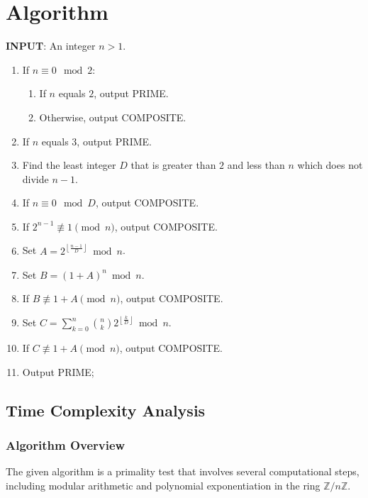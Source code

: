 \documentclass{article}
\theoremstyle{plain}
\theoremstyle{definition}
\begin{document}
\section{Algorithm} \label{section:algorithm}
\textbf{INPUT}: An integer $n > 1$.
\begin{center}
    \begin{enumerate}
        \item If $n \equiv 0 \mod{2}$:
            \begin{enumerate}
                \item If $n$ equals $2$, output PRIME.
                \item Otherwise, output COMPOSITE.
            \end{enumerate}
        \item If $n$ equals $3$, output PRIME.
        \item Find the least integer $D$ that is greater than $2$ and less than $n$ which does not divide $n-1$.
        \item If $n \equiv 0 \mod{D}$, output COMPOSITE.
        \item If $2^{n-1} \not\equiv 1 \pmod{n}$, output COMPOSITE.
        \item Set $A = 2^{\left\lfloor \frac{n-1}{D} \right\rfloor} \bmod{n}$.
        \item Set $B = (1 + A)^n \bmod{n}$.
        \item If $B \not\equiv 1 + A \pmod{n}$, output COMPOSITE.
        \item Set $C = \sum_{k=0}^{n} \binom{n}{k} 2^{\left\lfloor \frac{k}{D} \right\rfloor} \bmod{n}$.
        \item If $C \not\equiv 1 + A \pmod{n}$, output COMPOSITE.
        \item Output PRIME;
    \end{enumerate}
\end{center}

\subsection{Time Complexity Analysis} \label{subsection:timecomplexity}

\subsubsection{Algorithm Overview}
The given algorithm is a primality test that involves several computational steps, including modular arithmetic and polynomial exponentiation in the ring \(\mathbb{Z}/n\mathbb{Z}\).
\end{document}
